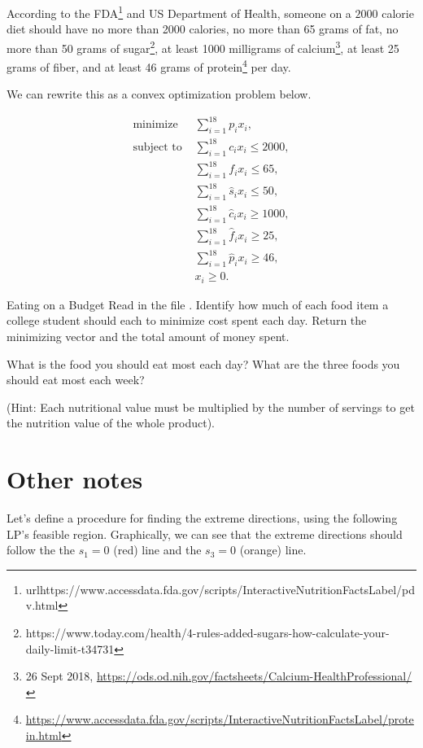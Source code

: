  According to the FDA\footnote[1]{url{https://www.accessdata.fda.gov/scripts/InteractiveNutritionFactsLabel/pdv.html}} and US Department of Health, someone on a $2000$ calorie diet should have no more than 2000 calories, no more than 65 grams of fat, no more than 50 grams of sugar\footnote[2]{https://www.today.com/health/4-rules-added-sugars-how-calculate-your-daily-limit-t34731}, at least 1000 milligrams of calcium\footnote[1]{26 Sept 2018, \url{https://ods.od.nih.gov/factsheets/Calcium-HealthProfessional/}}, at least 25 grams of fiber, and at least 46 grams of protein\footnote[2]{\url{https://www.accessdata.fda.gov/scripts/InteractiveNutritionFactsLabel/protein.html}} per day.

 We can rewrite this as a convex optimization problem below.

 \begin{align*}
\text{minimize } & \sum_{i=1}^{18}p_ix_i, \\
\text{subject to }& \sum_{i=1}^{18} c_ix_i \leq 2000, \\
			& \sum_{i=1}^{18} f_ix_i \leq 65, \\
			& \sum_{i=1}^{18} \hat{s}_ix_i \leq 50, \\
			& \sum_{i=1}^{18} \hat{c}_ix_i \geq 1000, \\
			& \sum_{i=1}^{18} \hat{f}_ix_i \geq 25, \\
			& \sum_{i=1}^{18} \hat{p}_ix_i \geq 46, \\
			& x_i \geq 0.
\end{align*}

 \begin{problem}{Eating on a Budget}{}
Read in the file .
Identify how much of each food item a college student should each to minimize cost spent each day.
Return the minimizing vector and the total amount of money spent.

What is the food you should eat most each day? 
What are the three foods you should eat most each week?

(Hint: Each nutritional value must be multiplied by the number of servings to get the nutrition value of the whole product).
\label{prob:diet}
\end{problem}


\section{Other notes}
Let's define a procedure for finding the extreme directions, using the following LP's feasible region.  Graphically, we can see that the extreme directions should follow the the $s_1=0$ (red) line and the $s_3 = 0$ (orange) line. 
 
